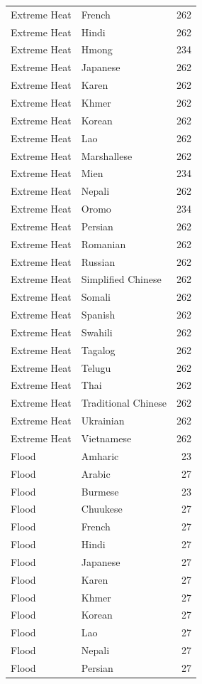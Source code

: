 \begin{longtable}{p{3cm} p{3cm} r}
Extreme Heat & French & 262 \\
Extreme Heat & Hindi & 262 \\
Extreme Heat & Hmong & 234 \\
Extreme Heat & Japanese & 262 \\
Extreme Heat & Karen & 262 \\
Extreme Heat & Khmer & 262 \\
Extreme Heat & Korean & 262 \\
Extreme Heat & Lao & 262 \\
Extreme Heat & Marshallese & 262 \\
Extreme Heat & Mien & 234 \\
Extreme Heat & Nepali & 262 \\
Extreme Heat & Oromo & 234 \\
Extreme Heat & Persian & 262 \\
Extreme Heat & Romanian & 262 \\
Extreme Heat & Russian & 262 \\
Extreme Heat & Simplified Chinese & 262 \\
Extreme Heat & Somali & 262 \\
Extreme Heat & Spanish & 262 \\
Extreme Heat & Swahili & 262 \\
Extreme Heat & Tagalog & 262 \\
Extreme Heat & Telugu & 262 \\
Extreme Heat & Thai & 262 \\
Extreme Heat & Traditional Chinese & 262 \\
Extreme Heat & Ukrainian & 262 \\
Extreme Heat & Vietnamese & 262 \\
Flood & Amharic & 23 \\
Flood & Arabic & 27 \\
Flood & Burmese & 23 \\
Flood & Chuukese & 27 \\
Flood & French & 27 \\
Flood & Hindi & 27 \\
Flood & Japanese & 27 \\
Flood & Karen & 27 \\
Flood & Khmer & 27 \\
Flood & Korean & 27 \\
Flood & Lao & 27 \\
Flood & Nepali & 27 \\
Flood & Persian & 27 \\

\end{longtable}
